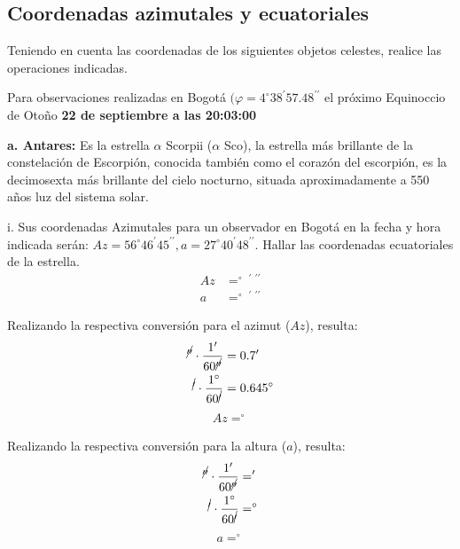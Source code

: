 \begin{multicols}{2}
   
   
   \section{Coordenadas azimutales y ecuatoriales}
   
   Teniendo en cuenta las coordenadas de los siguientes objetos celestes, realice las operaciones indicadas.
   
   Para observaciones realizadas en Bogotá $(\varphi = 4^{\circ} 38^{\prime} 57.48^{\prime \prime}$ el próximo Equinoccio de Otoño \textbf{22 de septiembre a las 20:03:00}
   
   \textbf{a. Antares:} Es la estrella $\alpha$ Scorpii ($\alpha$ Sco), la estrella más brillante de la constelación de Escorpión, conocida también como
   el corazón del escorpión, es la decimosexta más brillante del cielo nocturno, situada aproximadamente a 550 años luz del
   sistema solar.
   
   i. Sus coordenadas Azimutales para un observador en Bogotá en la fecha y hora indicada serán:
   $Az = 56^{\circ} 46^{\prime} 45^{\prime \prime}, a = 27^{\circ} 40^{\prime} 48^{\prime \prime} $. Hallar las coordenadas ecuatoriales de la estrella.
   \begin{align}
   Az &=^{\circ}~ ^{\prime}~ ^{\prime \prime} \\
   a &= ^{\circ}~ ^{\prime}~ ^{\prime \prime}
   \end{align}
   
   Realizando la respectiva conversión para el azimut ($Az$), resulta:
   \begin{align*}
   ^{\cancel{\prime \prime}}\cdot \frac{1 ^{\prime} }{60  ^{\cancel{\prime \prime}} } &=0.7 '\\ 
    ^{\cancel{\prime}}\cdot \frac{1 ^{\circ} }{60^{\cancel{\prime}}} &=0.645^{\circ}
   \end{align*}
   \begin{align}
   Az = ^{\circ}
   \end{align}
   
   Realizando la respectiva conversión para la altura ($a$), resulta:
   \begin{align*}
   ^{\cancel{\prime \prime}}\cdot \frac{1^{{\prime}} }{60^{\cancel{\prime \prime}}} &= '\\ 
    ^{\cancel{\prime}}\cdot \frac{1 ^{\circ} }{60^{\cancel{\prime}}} &=^{\circ}
   \end{align*}
   \begin{align}
   a = ^{\circ}
   \end{align}
   

\end{multicols}
